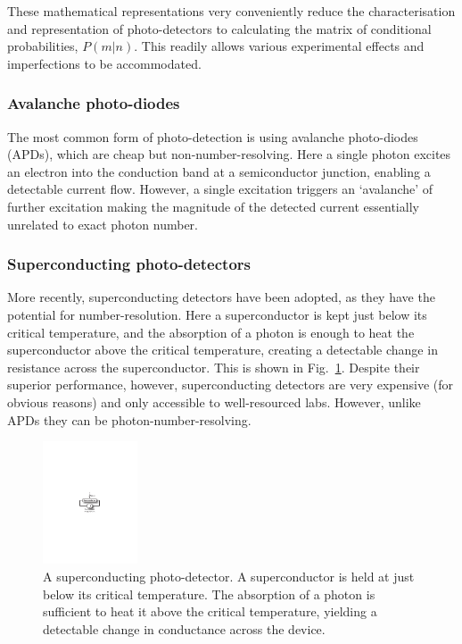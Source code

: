 These mathematical representations very conveniently reduce the characterisation and representation of photo-detectors to calculating the matrix of conditional probabilities, $P(m|n)$. This readily allows various experimental effects and imperfections to be accommodated.

%
%

\subsubsection{Avalanche photo-diodes}

The most common form of photo-detection is using avalanche photo-diodes (APDs), which are cheap but non-number-resolving. Here a single photon excites an electron into the conduction band at a semiconductor junction, enabling a detectable current flow. However, a single excitation triggers an `avalanche' of further excitation making the magnitude of the detected current essentially unrelated to exact photon number.

%
%

\subsubsection{Superconducting photo-detectors}

More recently, superconducting detectors have been adopted, as they have the potential for number-resolution. Here a superconductor is kept just below its critical temperature, and the absorption of a photon is enough to heat the superconductor above the critical temperature, creating a detectable change in resistance across the superconductor. This is shown in Fig.~\ref{fig:super_det}. Despite their superior performance, however, superconducting detectors are very expensive (for obvious reasons) and only accessible to well-resourced labs. However, unlike APDs they can be photon-number-resolving.

\begin{figure}[!htbp]
\includegraphics[clip=true, width=0.25\textwidth]{superconducting_detector}
\captionspacefig \caption{A superconducting photo-detector. A superconductor is held at just below its critical temperature. The absorption of a photon is sufficient to heat it above the critical temperature, yielding a detectable change in conductance across the device.} \label{fig:super_det}
\end{figure}

